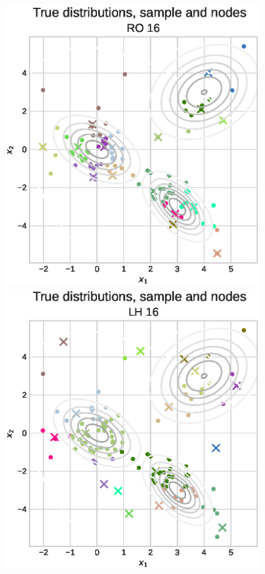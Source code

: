 \documentclass[shortabstract]{iithesis}
\begin{document}
\begin{figure}[!ht]
    \includegraphics[scale=0.42]{gaussianHmm_discrete_example_random.eps}
    \includegraphics[scale=0.42]{gaussianHmm_discrete_example_latin_cube_u.eps}

\end{figure}
\end{document}
